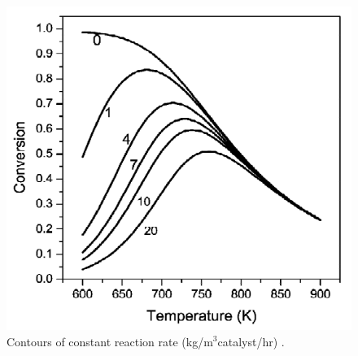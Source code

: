 \documentclass[11pt,letterpaper]{article}
\begin{document}
\begin{figure}[] %
	\centering
	\includegraphics[width=\linewidth]{figures/haberbosch2.png}
	\hfill
	\caption{Contours of constant reaction rate (kg/m$^3$catalyst/hr) \cite{modak_haber_2011}.}
	\label{fig:hbpt2}
\end{figure}



\pagebreak


\end{document}
